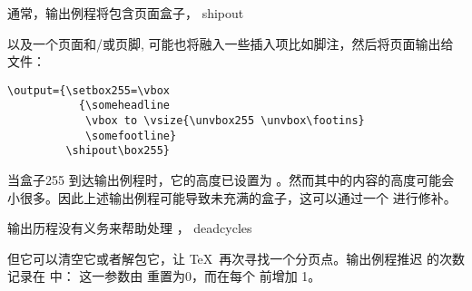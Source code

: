\documentclass{book}
\begin{document}

通常，输出例程将包含页面盒子，
\cstoidx shipout\par
\mdqon
以及一个页面和/或页脚,
\mdqoff
可能也将融入一些插入项比如脚注，然后将页面输出给  文件：

\begin{verbatim}
\output={\setbox255=\vbox
           {\someheadline
            \vbox to \vsize{\unvbox255 \unvbox\footins}
            \somefootline}
         \shipout\box255}
\end{verbatim}

当盒子255 到达输出例程时，它的高度已设置为 。然而其中的内容的高度可能会小很多。因此上述输出例程可能导致未充满的盒子，这可以通过一个  进行修补。



输出历程没有义务来帮助处理  ，
\cstoidx deadcycles\par
但它可以清空它或者解包它，让 \TeX\ 再次寻找一个分页点。输出例程推迟  的次数记录在 中： 这一参数由  重置为0，而在每个  前增加 1。


\end{document}
